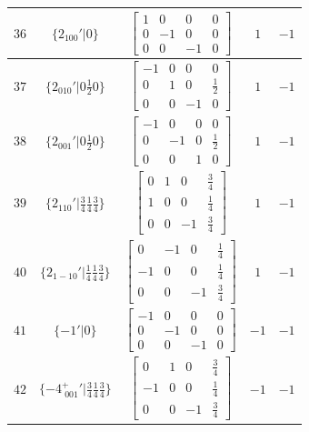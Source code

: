 \documentclass[fleqn,8pt]{jsarticle}
\begin{document}
\begin{longtable}{ccccc}
$ 36 $ & $ \{2{}_{100}{}'|0\} $ & $ \begin{bmatrix} 1 & 0 & 0 & 0 \\ 0 & -1 & 0 & 0 \\ 0 & 0 & -1 & 0 \end{bmatrix} $ & $ 1 $ & $ -1 $ \\ \hline
$ 37 $ & $ \{2{}_{010}{}'|0 \frac{1}{2} 0\} $ & $ \begin{bmatrix} -1 & 0 & 0 & 0 \\ 0 & 1 & 0 & \frac{1}{2} \\ 0 & 0 & -1 & 0 \end{bmatrix} $ & $ 1 $ & $ -1 $ \\ \hline
$ 38 $ & $ \{2{}_{001}{}'|0 \frac{1}{2} 0\} $ & $ \begin{bmatrix} -1 & 0 & 0 & 0 \\ 0 & -1 & 0 & \frac{1}{2} \\ 0 & 0 & 1 & 0 \end{bmatrix} $ & $ 1 $ & $ -1 $ \\ \hline
$ 39 $ & $ \{2{}_{110}{}'|\frac{3}{4} \frac{1}{4} \frac{3}{4}\} $ & $ \begin{bmatrix} 0 & 1 & 0 & \frac{3}{4} \\ 1 & 0 & 0 & \frac{1}{4} \\ 0 & 0 & -1 & \frac{3}{4} \end{bmatrix} $ & $ 1 $ & $ -1 $ \\ \hline
$ 40 $ & $ \{2{}_{1-10}{}'|\frac{1}{4} \frac{1}{4} \frac{3}{4}\} $ & $ \begin{bmatrix} 0 & -1 & 0 & \frac{1}{4} \\ -1 & 0 & 0 & \frac{1}{4} \\ 0 & 0 & -1 & \frac{3}{4} \end{bmatrix} $ & $ 1 $ & $ -1 $ \\ \hline
$ 41 $ & $ \{-1{}'|0\} $ & $ \begin{bmatrix} -1 & 0 & 0 & 0 \\ 0 & -1 & 0 & 0 \\ 0 & 0 & -1 & 0 \end{bmatrix} $ & $ -1 $ & $ -1 $ \\ \hline
$ 42 $ & $ \{-4^{+}_{\,\,001}{}'|\frac{3}{4} \frac{1}{4} \frac{3}{4}\} $ & $ \begin{bmatrix} 0 & 1 & 0 & \frac{3}{4} \\ -1 & 0 & 0 & \frac{1}{4} \\ 0 & 0 & -1 & \frac{3}{4} \end{bmatrix} $ & $ -1 $ & $ -1 $ \\ \hline

\end{longtable}
\end{document}
